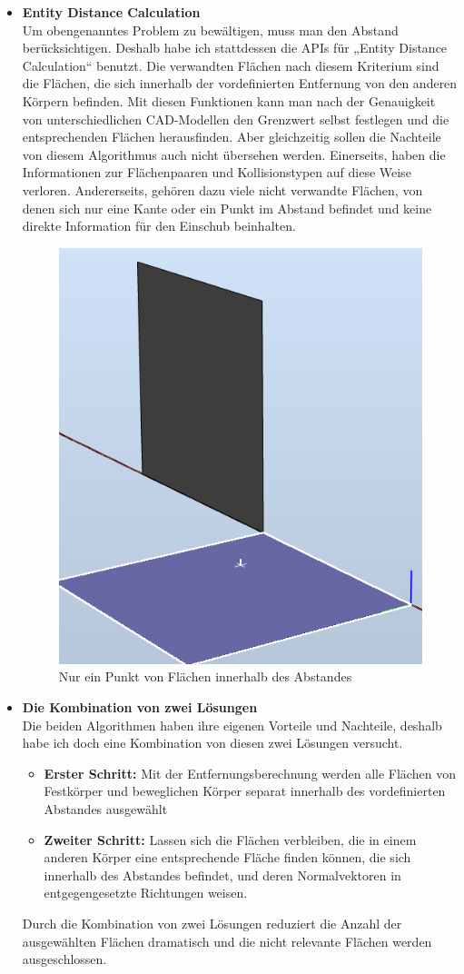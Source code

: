 \documentclass[14pt,a4paper,titlepage]{article}
\begin{document}
\begin{itemize}
				\item 
				\textbf{Entity Distance Calculation}
				\\ 
				Um obengenanntes Problem zu bewältigen, muss man den Abstand berücksichtigen. Deshalb habe ich stattdessen die APIs für „Entity Distance Calculation“ benutzt. Die verwandten Flächen nach diesem Kriterium sind die Flächen, die sich innerhalb der vordefinierten Entfernung von den anderen Körpern befinden. 
				\bigbreak
				Mit diesen Funktionen kann man nach der Genauigkeit von unterschiedlichen CAD-Modellen den Grenzwert selbst festlegen und die entsprechenden Flächen herausfinden. Aber gleichzeitig sollen die Nachteile von diesem Algorithmus auch nicht übersehen werden. Einerseits, haben die Informationen zur Flächenpaaren und Kollisionstypen auf diese Weise verloren. Andererseits, gehören dazu viele nicht verwandte Flächen, von denen sich nur eine Kante oder ein Punkt im Abstand befindet und keine direkte Information für den Einschub beinhalten. 
					\begin{figure}[h!]
					\centering
					\includegraphics[width=0.3\linewidth]{faces.png}
					\caption{Nur ein Punkt von Flächen innerhalb des Abstandes}
				\end{figure} 
				\pagebreak
				\item 
				\textbf{Die Kombination von zwei Lösungen} 
				\\
				Die beiden Algorithmen haben ihre eigenen Vorteile und Nachteile, deshalb habe ich doch eine Kombination von diesen zwei Lösungen versucht. 
				\begin{itemize}
					\item \textbf{Erster Schritt:}
					Mit der Entfernungsberechnung werden alle Flächen von Festkörper und beweglichen Körper separat innerhalb des vordefinierten Abstandes ausgewählt
					\item \textbf{Zweiter Schritt:}
					Lassen sich die Flächen verbleiben, die in einem anderen Körper eine entsprechende Fläche finden können, die sich innerhalb des Abstandes befindet, und deren Normalvektoren in entgegengesetzte Richtungen weisen.
				\end{itemize} 
			
				  Durch die Kombination von zwei Lösungen reduziert die Anzahl der ausgewählten Flächen dramatisch und die nicht relevante Flächen werden ausgeschlossen.     
			\end{itemize}
		
\end{document}
